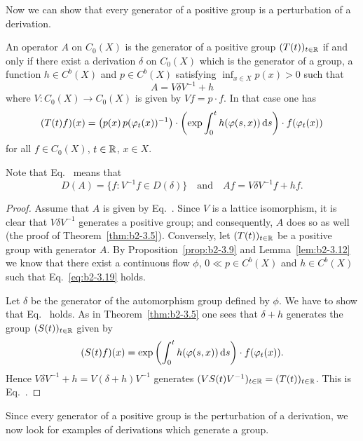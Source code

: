 Now we can show that every generator of a positive group is a perturbation of a derivation.
\begin{theorem}\label{thm:b2-3.14}
An operator $A$ on $C_{0}(X)$ is the generator of a positive group $(T(t))_{t \in \mathbb{R}}$ if and only if there exist a derivation $\delta$ on $C_{0}(X)$ which is the generator of a group, a function $h \in C^{b}(X)$ and $p \in C^{b}(X)$ satisfying $\inf_{x \in X} p(x) > 0$ such that
\begin{equation}\label{eq:b2-3.18}
A = V\delta V^{-1} + h
\end{equation}
where $V \colon C_{0}(X) \to C_{0}(X)$ is given by $Vf = p \cdot f$. In that case one has
\begin{equation}\label{eq:b2-3.19}
(T(t)f)(x) = \mleft( p(x) \, p(\phi_{t}(x))^{-1} \mright) \cdot 
\mleft(\exp \int_{0}^{t} h(\phi(s,x)) \ds \mright) \cdot f(\phi_{t}(x))
\end{equation}
for all $f \in C_{0}(X)$, $t \in \mathbb{R}$, $x \in X$.
\end{theorem}
Note that  Eq.~ means that 
%
\[
	D(A) = \{ f \colon V^{-1}f \in D(\delta) \}
	\quad \text{and} \quad
	Af = V\delta V^{-1}f + hf .
\]
\begin{proof}
Assume that $A$ is given by Eq.~.
Since $V$ is a lattice isomorphism, it is clear that $V\delta V^{-1}$ generates a positive group; and consequently, $A$ does so as well (\cf the proof of Theorem~\ref{thm:b2-3.5}).
Conversely, let $(T(t))_{t \in \mathbb{R}}$ be a positive group with generator $A$.
By Proposition~\ref{prop:b2-3.9} and Lemma~\ref{lem:b2-3.12} we know that there exist a continuous flow $\phi$, $0 \ll p \in C^{b}(X)$ and $h \in C^{b}(X)$ such that Eq.~\eqref{eq:b2-3.19} holds.

Let $\delta$ be the generator of the automorphism group defined by $\phi$.
We have to show that Eq.~ holds.
As in Theorem~\ref{thm:b2-3.5} one sees that $\delta + h$ generates the group $(S(t))_{t \in \mathbb{R}}$ given by 
\[
(S(t)f)(x) = \exp\left(\int_{0}^{t} h(\phi(s,x)) \ds \right) \cdot f(\phi_{t}(x)).
\]
Hence $V\delta V^{-1} + h = V(\delta + h)V^{-1}$ generates $(VS(t)V^{-1})_{t \in \mathbb{R}} = (T(t))_{t \in \mathbb{R}}$.
This is Eq.~.
\end{proof}
Since every generator of a positive group is the perturbation of a derivation, we now look for examples of derivations which generate a group.
